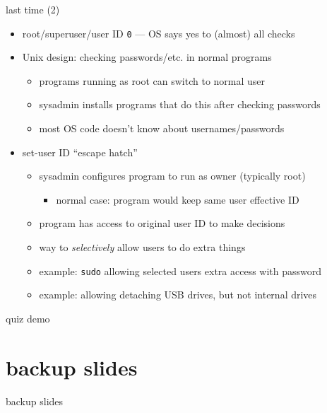 \begin{frame}{last time (2)}
    \begin{itemize}
    \item root/superuser/user ID \texttt{0} --- OS says yes to (almost) all checks
    \item Unix design: checking passwords/etc. in normal programs
        \begin{itemize}
        \item programs running as root can switch to normal user
        \item sysadmin installs programs that do this after checking passwords
        \item most OS code doesn't know about usernames/passwords
        \end{itemize}
    \item set-user ID ``escape hatch''
        \begin{itemize}
        \item sysadmin configures program to run as owner (typically root)
            \begin{itemize}
            \item normal case: program would keep same user effective ID
            \end{itemize}
        \item program has access to original user ID to make decisions
        \item way to \textit{selectively} allow users to do extra things
        \item example: \texttt{sudo} allowing selected users extra access with password
        \item example: allowing detaching USB drives, but not internal drives
        \end{itemize}
    \end{itemize}
\end{frame}

\begin{frame}{quiz demo}
\end{frame}







\section{backup slides}
\begin{frame}{backup slides}
\end{frame}


